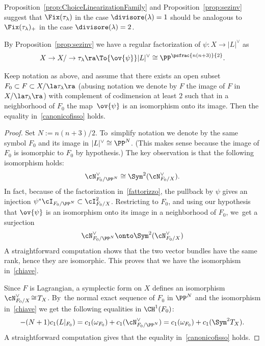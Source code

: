 \begin{rema}
Proposition~\ref{prop:ChoiceLinearizationFamily} and Proposition~\ref{prop:sezinv}
suggest that $\Fix(\tau_{\lambda})$ in the case $\divisore(\lambda)=1$ should be analogous to $\Fix(\tau_{\lambda})_{+}$ in the case $\divisore(\lambda)=2$.
\end{rema}

By Proposition~\ref{prop:sezinv}
we have a regular factorization of $\psi\colon X\to |L|^{\vee}$ as\vspace*{-5pt}
\begin{equation}\label{fattorizzo}
X\to X/\to \tau_{\lambda}\ra \To{\ov{\psi}} |L|^{\vee}\cong\PP^{\psfrac{n(n+3)}{2}}.
\end{equation}

\begin{prop}
Keep notation as above, and assume that there exists an open subset
$F_0\subset F\subset X/\la \tau_{\lambda}\ra$ (abusing notation we denote by $F$ the image of $F$ in $X/\la \tau_{\lambda}\ra$) with complement of codimension at least $2$ such that in a neighborhood of $F_0$ the map~$\ov{\psi}$ is an isomorphism onto its image. Then the equality in~\eqref{canonicofisso} holds.
\end{prop}

\begin{proof}
Set $N:=n(n+3)/2$. To~simplify notation we denote by the same symbol $F_0$ and its image in $|L|^{\vee}\cong\PP^{N}$. (This makes sense because the image of $F_0$ is isomorphic to $F_0$ by hypothesis.) The key observation is that the following isomorphism holds:\vspace*{-3pt}
\begin{equation}\label{chiave}
\cN^{\vee}_{F_0/\PP^N}\cong \Sym^2(\cN^{\vee}_{F_0/X}).
\end{equation}
In fact, because of the factorization in~\eqref{fattorizzo}, the pullback by $\psi$ gives an injection $\psi^{*}\cI_{F_0/\PP^N}\subset \cI_{F_0/X}^2$. Restricting to $F_0$, and using our hypothesis that $\ov{\psi}$ is an isomorphism onto its image in a neighborhood of $F_0$, we~get a surjection\vspace*{-3pt}
\begin{equation*}
\cN_{F_0/\PP^N}^{\vee}\onto \Sym^2(\cN^{\vee}_{F_0/X})
\end{equation*}
A straightforward computation shows that the two vector bundles have the same rank, hence they are isomorphic. This proves that we have the isomorphism in~\eqref{chiave}.

Since $F$ is Lagrangian, a symplectic form on $X$ defines an isomorphism \hbox{$\cN^{\vee}_{F_0/X}\!\cong\! T_X$}. By~the normal exact sequence of $F_0$ in $\PP^N$ and the isomorphism in~\eqref{chiave} we get the following equalities in $\CH^1(F_0)$:\vspace*{-3pt}
\begin{equation*}
-(N+1) c_1(L|_{F_0})=c_1(\omega_{F_0})+c_1(\cN^{\vee}_{F_0/\PP^N})=
c_1(\omega_{F_0})+c_1(\Sym^2 T_X).
\end{equation*}
A straightforward computation gives that the equality in~\eqref{canonicofisso} holds.
\end{proof}
